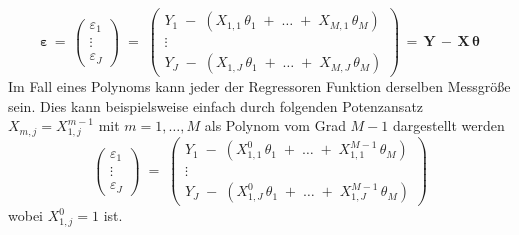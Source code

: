 \begin{equation}
\boldsymbol{\varepsilon} \, =  \, \left(
\begin{array}{c}
\varepsilon_1\\
\vdots \\
\varepsilon_J
\end{array}
\right)  \; = \;
\left(
\begin{array}{c}
 Y_{1} \; - \; (X_{1,1} \, \theta_1  \; + \; \dots  \; + \;  X_{M,1} \, \theta_{M})\\
\vdots \\
 Y_{J} \; - \; (X_{1,J} \, \theta_1 \; + \; \dots  \; + \;  X_{M,J} \, \theta_{M})
\end{array}\right)  \, = \, 
\mathbf{Y} \, -  \, \mathbf{X} \, \boldsymbol{\theta}
\end{equation}
Im Fall eines Polynoms kann jeder der Regressoren Funktion derselben Messgröße sein.
Dies kann beispielsweise einfach
durch folgenden Potenzansatz $X_{m,j} = X_{1,j}^{m-1}$ mit $m = 1,\dots,M$ als
Polynom vom Grad $M-1$ dargestellt werden
\begin{equation}
\left(
\begin{array}{c}
\varepsilon_1\\
\vdots \\
\varepsilon_J
\end{array}
\right)  \; = \;
\left(
\begin{array}{c}
 Y_{1} \; - \; (X_{1,1}^0 \, \theta_1  \; + \; \dots  \; + \;  X_{1,1}^{M-1} \, \theta_{M})\\
\vdots \\
 Y_{J} \; - \; (X_{1,J}^0 \, \theta_1 \; + \; \dots  \; + \;  X_{1,J}^{M-1} \, \theta_{M})
\end{array}\right)
\end{equation}
wobei $X_{1,j}^0 = 1$ ist.

